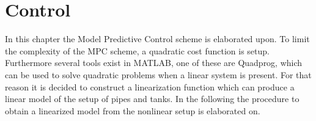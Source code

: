 \chapter{Control}\label{ch:control}

In this chapter the Model Predictive Control scheme is elaborated upon. To limit the complexity of the MPC scheme, a quadratic cost function is setup. 
Furthermore several tools exist in MATLAB, one of these are Quadprog, which can be used to solve quadratic problems when a linear system is present.  
For that reason it is decided to construct a linearization function which can produce a linear model of the setup of pipes and tanks. 
In the following the procedure to obtain a linearized model from the nonlinear setup is elaborated on.



